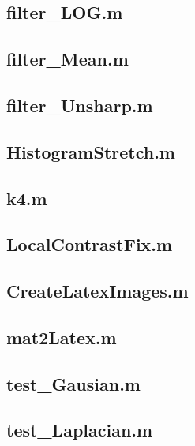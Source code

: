 \subsection*{ filter\_LOG.m       } \newpage
\subsection*{ filter\_Mean.m      } \newpage
\subsection*{ filter\_Unsharp.m   } \newpage
\subsection*{ HistogramStretch.m  } \newpage
\subsection*{ k4.m                } \newpage
\subsection*{ LocalContrastFix.m  } \newpage
\subsection*{ CreateLatexImages.m } \newpage
\subsection*{ mat2Latex.m         } \newpage
\subsection*{ test\_Gausian.m     } \newpage
\subsection*{ test\_Laplacian.m   } \newpage
